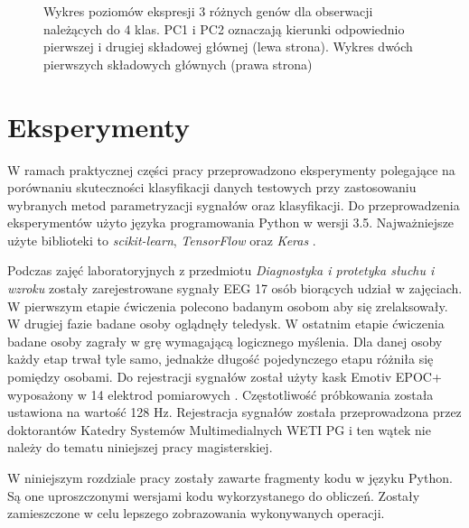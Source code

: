 \documentclass[notitlepage]{report}
\begin{document}
\begin{figure}[H]
	\centering
	\caption{Wykres poziomów ekspresji 3 różnych genów dla obserwacji należących do 4 klas. PC1 i PC2 oznaczają kierunki odpowiednio pierwszej i drugiej składowej głównej (lewa strona). Wykres dwóch pierwszych składowych głównych (prawa strona) \cite{pca}}
\end{figure}



\chapter{Eksperymenty}
W ramach praktycznej części pracy przeprowadzono eksperymenty polegające na porównaniu skuteczności klasyfikacji danych testowych przy zastosowaniu wybranych metod parametryzacji sygnałów oraz klasyfikacji. Do przeprowadzenia eksperymentów użyto języka programowania Python w wersji 3.5. Najważniejsze użyte biblioteki to \textit{scikit-learn}, \textit{TensorFlow} oraz \textit{Keras} \cite{keras} \cite{sklearn} \cite{tensorflow}.

Podczas zajęć laboratoryjnych z przedmiotu \textit{Diagnostyka i protetyka słuchu i wzroku} zostały zarejestrowane sygnały EEG 17 osób biorących udział w zajęciach. W pierwszym etapie ćwiczenia polecono badanym osobom aby się zrelaksowały. W drugiej fazie badane osoby oglądnęły teledysk. W ostatnim etapie ćwiczenia badane osoby zagrały w grę wymagającą logicznego myślenia. Dla danej osoby każdy etap trwał tyle samo, jednakże długość pojedynczego etapu różniła się pomiędzy osobami. Do rejestracji sygnałów został użyty kask Emotiv EPOC+ wyposażony w 14 elektrod pomiarowych \cite{emotiv}. Częstotliwość próbkowania została ustawiona na wartość 128 Hz. Rejestracja sygnałów została przeprowadzona przez doktorantów Katedry Systemów Multimedialnych WETI PG i ten wątek nie należy do tematu niniejszej pracy magisterskiej.

W niniejszym rozdziale pracy zostały zawarte fragmenty kodu w języku Python. Są one uproszczonymi wersjami kodu wykorzystanego do obliczeń. Zostały zamieszczone w celu lepszego zobrazowania wykonywanych operacji.
\end{document}
